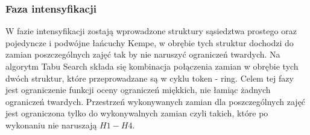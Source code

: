 \subsubsection{Faza intensyfikacji}
\par W fazie intensyfikacji zostają wprowadzone struktury sąsiedztwa prostego oraz pojedyncze i podwójne łańcuchy Kempe, w obrębie tych struktur dochodzi do zamian poszczególnych zajęć tak by nie naruszyć ograniczeń twardych. Na algorytm Tabu Search składa się kombinacja połączenia zamian w obrębie tych dwóch struktur, które przeprowadzane są w cyklu token - ring. Celem tej fazy jest ograniczenie funkcji oceny ograniczeń miękkich, nie łamiąc żadnych ograniczeń twardych. Przestrzeń wykonywanych zamian dla poszczególnych zajęć jest ograniczona tylko do wykonywalnych zamian czyli takich, które po wykonaniu nie naruszają ${H1-H4}$.
